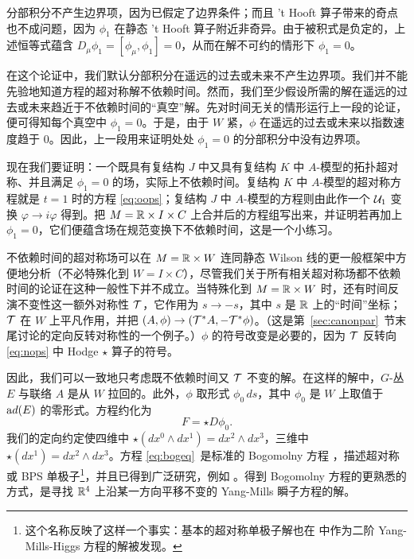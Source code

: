 分部积分不产生边界项，因为已假定了边界条件；而且 't Hooft 算子带来的奇点也不成问题，因为 $\phi_1$ 在静态 't Hooft 算子附近非奇异。由于被积式是负定的，上述恒等式蕴含 $D_\mu\phi_1=[\phi_\mu,\phi_1]=0$，从而在解不可约的情形下 $\phi_1=0$。

在这个论证中，我们默认分部积分在遥远的过去或未来不产生边界项。我们并不能先验地知道方程的超对称解不依赖时间。然而，我们至少假设所需的解在遥远的过去或未来趋近于不依赖时间的“真空”解。先对时间无关的情形运行上一段的论证，便可得知每个真空中 $\phi_1=0$。于是，由于 $W$ 紧，$\phi$ 在遥远的过去或未来以指数速度趋于 0。因此，上一段用来证明处处 $\phi_1=0$ 的分部积分中没有边界项。

现在我们要证明：一个既具有复结构 $J$ 中又具有复结构 $K$ 中 $A$-模型的拓扑超对称、并且满足 $\phi_1=0$ 的场，实际上不依赖时间。复结构 $K$ 中 $A$-模型的超对称方程就是 $t=1$ 时的方程 \eqref{eq:oops}；复结构 $J$ 中 $A$-模型的方程则由此作一个 ${\cal U}_1$ 变换 $\varphi\to i\varphi$ 得到。把 $M=\Bbb{R}\times I\times C$ 上合并后的方程组写出来，并证明若再加上 $\phi_1=0$，它们便蕴含场在规范变换下不依赖时间，这是一个小练习。

不依赖时间的超对称场可以在 $M=\Bbb{R}\times W$ 连同静态 Wilson 线的更一般框架中方便地分析（不必特殊化到 $W=I\times C$），尽管我们关于所有相关超对称场都不依赖时间的论证在这种一般性下并不成立。当特殊化到 $M=\Bbb{R}\times W$ 时，还有时间反演不变性这一额外对称性 ${\EUT}$，它作用为 $s\to -s$，其中 $s$ 是 $\Bbb{R}$ 上的“时间”坐标；${\EUT}$ 在 $W$ 上平凡作用，并把 $(A,\phi)\to ({\EUT}^*A,-{\EUT}^*\phi)$。（这是第~\ref{sec:canonpar}~节末尾讨论的定向反转对称性的一个例子。）$\phi$ 的符号改变是必要的，因为 ${\EUT}$ 反转向 \eqref{eq:nops} 中 Hodge $\star$ 算子的符号。

因此，我们可以一致地只考虑既不依赖时间又 ${\EUT}$ 不变的解。在这样的解中，$G$-丛 $E$ 与联络 $A$ 是从 $W$ 拉回的。此外，$\phi$ 取形式 $\phi_0\,ds$，其中 $\phi_0$ 是 $W$ 上取值于 ${\rm ad}(E)$ 的零形式。方程约化为
\setcounter{equation}{4}
\begin{equation}\label{eq:bogeq}
F=\star D\phi_0.
\end{equation}
 我们的定向约定使四维中 $\star(dx^0\wedge dx^1)=dx^2\wedge dx^3$，三维中 $\star(dx^1)=dx^2\wedge dx^3$。方程 \eqref{eq:bogeq}\ 是标准的 Bogomolny 方程 \cite{ref105}，描述超对称或 BPS 单极子\footnote{这个名称反映了这样一个事实：基本的超对称单极子解也在 \cite{ref106} 中作为二阶 Yang-Mills-Higgs 方程的解被发现。}，并且已得到广泛研究，例如 
\cite{ref107,ref108,ref109}。得到 Bogomolny 方程的更熟悉的方式，是寻找 $\Bbb{R}^4$ 上沿某一方向平移不变的 Yang-Mills 瞬子方程的解。

